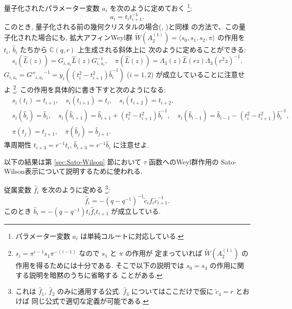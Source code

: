 \documentclass[12pt,twoside,dvipdfm]{msjproc}
\newcommand\C{{\mathbb C}} %
\theoremstyle{definition} %
\theoremstyle{definition} %
\theoremstyle{definition} %
\numberwithin{theorem}{section}
\numberwithin{equation}{section}
\numberwithin{figure}{section}
\numberwithin{table}{section}
\newcommand\secref[1]{第 \ref{#1} 節}
\newcommand\bra{\langle}
\newcommand\ket{\rangle}
\newcommand\WW{\widetilde{W}}
\newcommand\tc{{\tilde{c}}}
\newcommand\hL{{\widehat{L}}}
\newcommand\hb{{\hat{b}}}
\newcommand\hf{{\hat{f}}}
\begin{document}
量子化されたパラメーター変数 $a_i$ を次のように定めておく%
\footnote{パラメーター変数 $a_i$ は単純コルートに対応している.}:
\begin{equation*}
  a_i = t_i t_{i+1}^{-1}.
\end{equation*}
このとき, 量子化される前の幾何クリスタルの場合(\cite{BK-GC1}, \cite{BK-GC2})と同様
の方法で、この量子化された場合にも, 
拡大アフィンWeyl群 $\WW(A^{(1)}_2)=\bra s_0,s_1,s_2,\pi\ket$
の作用を $t_i$, $\hb_i$ たちから $\C(q,r)$ 上生成される斜体上に
次のように定めることができる:
\begin{equation*}
 s_i(\hL(z)) = G_{i,a_i} \hL(z) G_{i,a_i}^{-1}, \quad
 \pi(\hL(z)) = \Lambda_3(z) \hL(rz) \Lambda_3(r^2z)^{-1}.
\end{equation*}
$G_{i,a_i} = {G''_{i,a_i}}^{-1} = y_i((t_i^2-t_{i+1}^2)\hb_i^{-1})$ 
($i=1,2$) が成立していることに注意せよ%
\footnote{$s_i = \pi^{i-1}s_1\pi^{-(i-1)}$ なので $s_1$ と $\pi$ の作用が
定まっていれば $\WW(A^{(1)}_2)$ の作用を得るためには十分である.
そこで以下の説明では $s_0=s_3$ の作用に関する説明を暗黙のうちに省略する
ことがある.}.
この作用を具体的に書き下すと次のようになる:
\begin{align*}
 &
 s_i(t_i) = t_{i+1}, \quad
 s_i(t_{i+1}) = t_i, \quad
 s_i(t_{i+2}) = t_{i+2},
 \\ &
 s_i(\hb_i) = \hb_i, \quad
 s_i(\hb_{i+1}) = \hb_{i+1} + (t_i^2-t_{i+1}^2)\hb_i^{-1}, \quad
 s_i(\hb_{i-1}) = \hb_{i-1} - (t_i^2-t_{i+1}^2)\hb_i^{-1},
 \\ &
 \pi(t_j) = t_{j+1}, \quad
 \pi(\hb_j) = \hb_{j+1}.
\end{align*}
準周期性 $t_{i+3}=r^{-1}t_i$, $\hb_{i+3}=r^{-1}\hb_i$ に注意せよ.


以下の結果は\secref{sec:Sato-Wilson}において $\tau$ 函数へのWeyl群作用の
Sato-Wilson表示について説明するために使われる.

従属変数 $\hf_i$ を次のように定める
\footnote{これは $\hf_1$, $\hf_2$ のみに通用する公式.
$\hf_3$ についてはここだけで仮に $\tc_4=r$ とおけば
同じ公式で適切な定義が可能である.}:
\begin{equation*} 
 \hf_i = -(q-q^{-1})^{-1}\tc_i f_i \tc_{i+1}^{-1}.
\end{equation*}
このとき $\hb_i = -(q-q^{-1})t_i \hf_i t_{i+1}$ が成立している.
\end{document}
